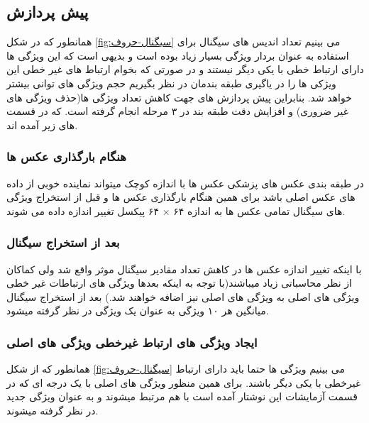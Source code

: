 \documentclass[10pt,a4paper]{article}
\begin{document}
\subsection{پیش پردازش}
همانطور که در شکل
\ref{fig:سیگنال-حروف}
می بینیم تعداد اندیس های سیگنال برای استفاده به عنوان بردار ویژگی بسیار زیاد بوده است و بدیهی است که این ویژگی ها دارای ارتباط خطی با یکی دیگر نیستند و در صورتی که بخوام ارتباط های غیر خطی این ویژکی ها را در یاگیری طبقه بندمان در نظر بگیریم حجم ویژگی های توانی بیشتر خواهد شد. بنابراین پیش پردازش های جهت کاهش تعداد ویژگی ها(حذف ویژگی های غیر ضروری) و افزایش دقت طبقه بند در ۳ مرحله انجام گرفته است. که در قسمت های زیر آمده اند.
\subsubsection{هنگام بارگذاری عکس ها}
در طبقه بندی عکس های پزشکی عکس ها با اندازه کوچک میتواند نماینده خوبی از داده های عکس اصلی باشد برای همین هنگام بارگذاری عکس ها و قبل از استخراج ویژگی های سیگنال
تمامی عکس ها به اندازه ۶۴
$\times$
۶۴ پیکسل تغییر اندازه داده می شوند.
\subsubsection{بعد از استخراج سیگنال }
با اینکه تغییر اندازه عکس ها در کاهش تعداد مقادیر سیگنال
موثر واقع شد ولی کماکان از نظر محاسباتی زیاد میباشند(با توجه به اینکه بعدها ویژگی های ارتباطات غیر خطی ویژگی های اصلی به ویژگی های اصلی نیز اضافه خواهند شد.) بعد از استخراج سیگنال
میانگین هر ۱۰ ویژگی به عنوان یک ویژگی در نظر گرفته میشود.
\subsubsection{ایجاد ویژگی های ارتباط غیرخطی ویژگی های اصلی}
همانطور که از شکل
\ref{fig:سیگنال-حروف}
می بینیم ویژگی ها حتما باید دارای ارتباط غیرخطی با یکی دیگر باشند. برای همین منظور ویژگی های اصلی با یک درجه ای که در قسمت آزمایشات این نوشتار آمده است با هم مرتبط میشوند و به عنوان ویژگی جدید در نظر گرفته میشوند.
\end{document}

